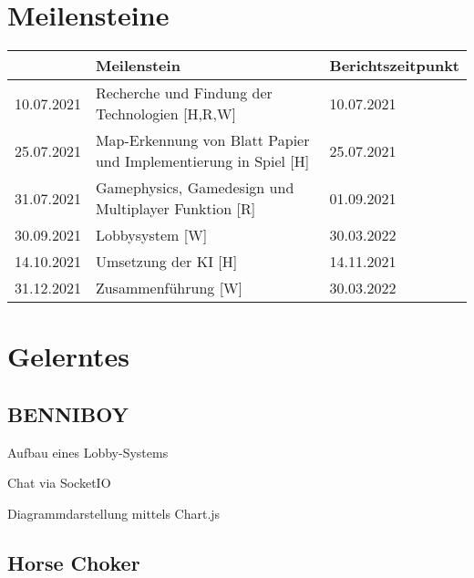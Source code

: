 \section{Meilensteine}
\begin{table}[H]
    \begin{tabular}{|l|l|l|}
        \hline
        \multicolumn{1}{|r|}{\textit{}} & \textbf{Meilenstein}                                                & \textbf{Berichtszeitpunkt} \\ \hline
        10.07.2021                      & Recherche und Findung der Technologien {[}H,R,W{]}                  & 10.07.2021                 \\ \hline
        25.07.2021                      & Map-Erkennung von Blatt Papier und Implementierung in Spiel {[}H{]} & 25.07.2021                 \\ \hline
        31.07.2021                      & Gamephysics, Gamedesign und Multiplayer Funktion {[}R{]}            & 01.09.2021                 \\ \hline
        30.09.2021                      & Lobbysystem {[}W{]}                                                 & 30.03.2022                 \\ \hline
        14.10.2021                      & Umsetzung der KI {[}H{]}                                            & 14.11.2021                 \\ \hline
        31.12.2021                      & Zusammenführung {[}W{]}                                             & 30.03.2022                 \\ \hline
    \end{tabular}
\end{table}
\section{Gelerntes}
\subsection{BENNIBOY}
\begin{compactitem}
    \item Aufbau eines Lobby-Systems
    \item Chat via SocketIO
    \item Diagrammdarstellung mittels Chart.js
\end{compactitem}
\subsection{Horse Choker}

